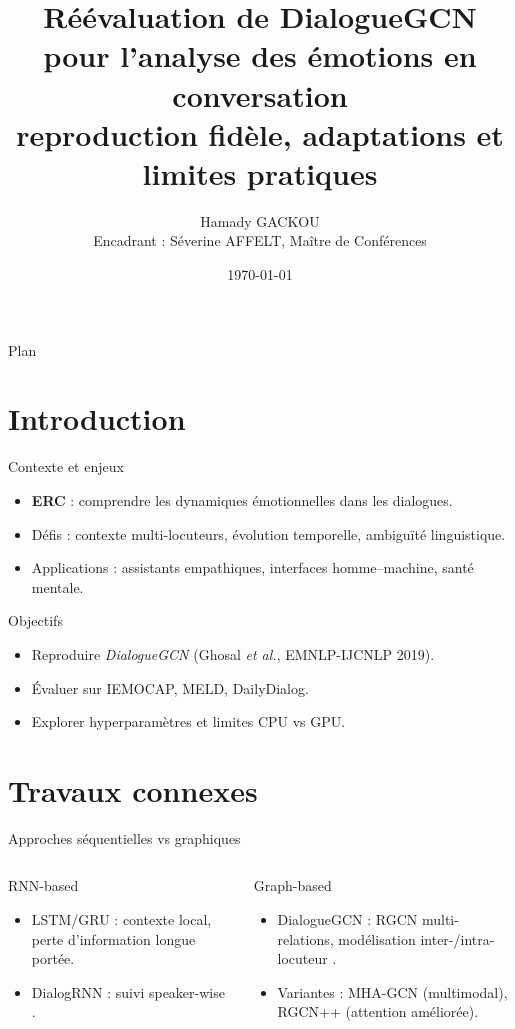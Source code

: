 \documentclass[10pt,aspectratio=169]{beamer}
\title[Réévaluation DialogueGCN]{\Large Réévaluation de DialogueGCN pour l’analyse des émotions en conversation\\reproduction fidèle, adaptations et limites pratiques}
\author[Hamady GACKOU]{Hamady GACKOU\\\small Encadrant : Séverine AFFELT, Maître de Conférences}
\institute{Université Paris Cité \\ Master 1 AMSD}
\date{\today}
\begin{document}
\begin{frame}[plain]
  \titlepage
\end{frame}

\begin{frame}{Plan}
  \tableofcontents
\end{frame}

\section{Introduction}
\begin{frame}{Contexte et enjeux}
  \begin{itemize}
    \item \textbf{ERC} : comprendre les dynamiques émotionnelles dans les dialogues.
    \item Défis : contexte multi-locuteurs, évolution temporelle, ambiguïté linguistique.
    \item Applications : assistants empathiques, interfaces homme–machine, santé mentale.
  \end{itemize}
  \vfill
  \begin{block}{Objectifs}
    \begin{itemize}
      \item Reproduire \emph{DialogueGCN} (Ghosal \emph{et al.}, EMNLP-IJCNLP 2019).
      \item Évaluer sur IEMOCAP, MELD, DailyDialog.
      \item Explorer hyperparamètres et limites CPU vs GPU.
    \end{itemize}
  \end{block}
\end{frame}

\section{Travaux connexes}
\begin{frame}{Approches séquentielles vs graphiques}
  \begin{columns}
    \begin{block}{RNN-based}
      \begin{itemize}
        \item LSTM/GRU : contexte local, perte d’information longue portée.
        \item DialogRNN : suivi speaker-wise \cite{majumder2019dialoguernn}.
      \end{itemize}
    \end{block}
    \begin{block}{Graph-based}
      \begin{itemize}
        \item DialogueGCN : RGCN multi-relations, modélisation inter-/intra-locuteur \cite{ghosal2019dialoguegcn}.
        \item Variantes : MHA-GCN (multimodal), RGCN++ (attention améliorée).
      \end{itemize}
    \end{block}
  \end{columns}
\end{frame}
\end{document}
